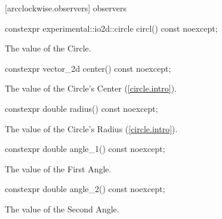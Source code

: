  [arcclockwise.observers]{ observers}

\begin{itemdecl}
constexpr experimental::io2d::circle circl() const noexcept;
\end{itemdecl}
\begin{itemdescr}
\pnum
\returns
The value of the Circle.
\end{itemdescr}

\begin{itemdecl}
constexpr vector_2d center() const noexcept;
\end{itemdecl}
\begin{itemdescr}
\pnum
\returns
The value of the Circle's Center (\ref{circle.intro}).
\end{itemdescr}

\begin{itemdecl}
constexpr double radius() const noexcept;
\end{itemdecl}
\begin{itemdescr}
\pnum
\returns
The value of the Circle's Radius (\ref{circle.intro}).
\end{itemdescr}

\begin{itemdecl}
constexpr double angle_1() const noexcept;
\end{itemdecl}
\begin{itemdescr}
\pnum
\returns
The value of the First Angle.
\end{itemdescr}

\begin{itemdecl}
constexpr double angle_2() const noexcept;
\end{itemdecl}
\begin{itemdescr}
\pnum
\returns
The value of the Second Angle.
\end{itemdescr}
